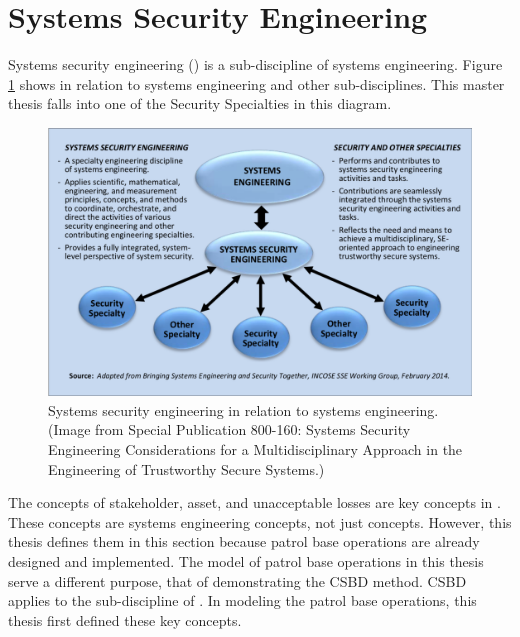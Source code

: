 \documentclass[../../main/main.tex]{subfiles}
\begin{document}
\section{Systems Security Engineering}\label{sec:sse}
Systems security engineering () is a sub-discipline of systems engineering.  Figure \ref{fig:nist800160} shows  in relation to systems engineering and other sub-disciplines.  This master thesis falls into one of the Security Specialties in this diagram.

\begin{figure}[ht]
\includegraphics[width=\linewidth]{../figures/seincontext.png}
\caption{\label{fig:nist800160}Systems security engineering in relation to systems engineering. (Image from  Special Publication 800-160: Systems Security Engineering Considerations for a Multidisciplinary Approach in the Engineering of Trustworthy Secure Systems.)}
\end{figure}


The concepts of stakeholder, asset, and unacceptable losses are key concepts in .  These concepts are systems engineering concepts, not just  concepts.  However, this thesis defines them in this section because patrol base operations are already designed and implemented.  The model of patrol base operations in this thesis serve a different purpose, that of demonstrating the CSBD method.  CSBD applies to the sub-discipline of .  In modeling the patrol base operations, this thesis first defined these key concepts.  
\end{document}
